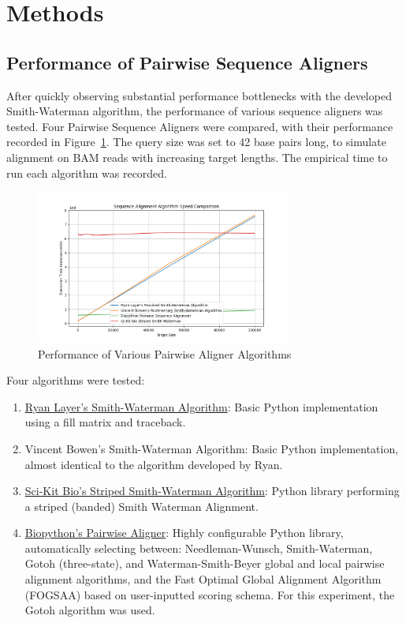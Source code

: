 \documentclass[11pt, letterpaper]{article}
\begin{document}
\section{Methods}
\subsection{Performance of Pairwise Sequence Aligners}
After quickly observing substantial performance bottlenecks with the developed Smith-Waterman algorithm, the performance of various sequence aligners was tested. Four Pairwise Sequence Aligners were compared, with their performance recorded in Figure~\ref{fig:pw_performance}. The query size was set to 42 base pairs long, to simulate alignment on BAM reads with increasing target lengths. The empirical time to run each algorithm was recorded.

\begin{figure}[H]
\centering
\includegraphics[width=0.75\textwidth]{imgs/pw_perf.png}
\caption{Performance of Various Pairwise Aligner Algorithms}
\label{fig:pw_performance}
\end{figure}

Four algorithms were tested:
\begin{enumerate}
    \item \href{google.com}{Ryan Layer's Smith-Waterman Algorithm}: Basic Python implementation using a fill matrix and traceback. 
    \item Vincent Bowen's Smith-Waterman Algorithm: Basic Python implementation, almost identical to the algorithm developed by Ryan.
    \item \href{https://scikit.bio/docs/dev/generated/skbio.alignment.StripedSmithWaterman.html}{Sci-Kit Bio's Striped Smith-Waterman Algorithm}: Python library performing a striped (banded) Smith Waterman Alignment.
    \item \href{https://biopython.org/docs/dev/Tutorial/chapter_pairwise.html}{Biopython's Pairwise Aligner}: Highly configurable Python library, automatically selecting between: Needleman-Wunsch, Smith-Waterman, Gotoh (three-state), and Waterman-Smith-Beyer global and local pairwise alignment algorithms, and the Fast Optimal Global Alignment Algorithm (FOGSAA) based on user-inputted scoring schema. For this experiment, the Gotoh algorithm was used.
\end{enumerate}
\end{document}
